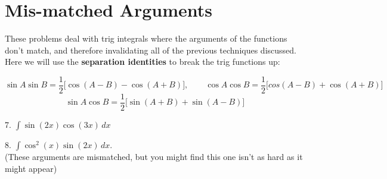 \documentclass[paper=a4, fontsize=11pt]{scrartcl} %
\numberwithin{equation}{section} %
\numberwithin{figure}{section} %
\numberwithin{table}{section} %
\begin{document}
\newpage

\section*{Mis-matched Arguments}

These problems deal with trig integrals where the arguments of the functions don't match, and therefore invalidating all of the previous techniques discussed.  Here we will use the {\bfseries separation identities} to break the trig functions up:

\[\sin A \sin B = \frac{1}{2}\big[\cos(A - B) - \cos(A + B)\big], \qquad \cos A \cos B = \frac{1}{2}\big[cos(A-B) + \cos(A+B)\big]\]
\[\sin A \cos B = \frac{1}{2}\big[\sin(A+B) + \sin(A-B)\big]\]

7. \quad $\displaystyle \int \sin(2x)\cos(3x)\,dx$

\vfill

8. \quad $\displaystyle \int \cos^2(x)\sin(2x)\,dx$.\\
(These arguments are mismatched, but you might find this one isn't as hard as it might appear)

\vfill
\end{document}
